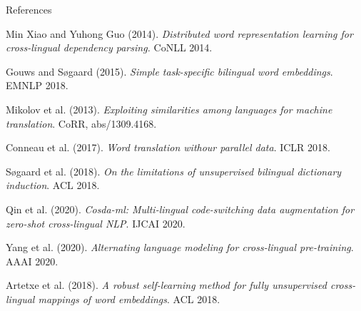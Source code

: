 \documentclass[english]{beamer}
\begin{document}
\begin{frame}[allowframebreaks]{References}

\begin{thebibliography}{9}

	Min Xiao and Yuhong Guo (2014). \emph{Distributed word representation learning for cross-lingual dependency parsing.} CoNLL 2014.
	
	Gouws and Søgaard (2015). \emph{Simple task-specific bilingual word embeddings}. EMNLP 2018.

	Mikolov et al. (2013). \emph{Exploiting similarities among languages for machine
	translation}. CoRR, abs/1309.4168.

	Conneau et al. (2017). \emph{Word translation withour parallel data}. ICLR 2018.

	Søgaard et al. (2018). \emph{On the limitations of unsupervised bilingual dictionary induction}. ACL 2018.

	Qin et al. (2020). \emph{Cosda-ml: Multi-lingual code-switching data augmentation for zero-shot cross-lingual NLP}. IJCAI 2020.

	Yang et al. (2020). \emph{Alternating language modeling for cross-lingual pre-training}. AAAI 2020.


	Artetxe et al. (2018). \emph{A robust self-learning method for fully unsupervised cross-lingual mappings of word embeddings}. ACL 2018.

	\end{thebibliography}	
	
\end{frame}
\end{document}
